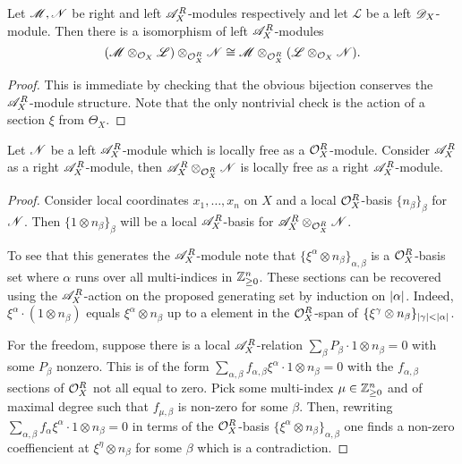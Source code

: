 \begin{lemma}\label{lem: IsomorphismTensors}
  Let $\mathscr{M}, \mathscr{N}$ be right and left $\mathscr{A}_X^R$-modules respectively and let $\mathscr{L}$ be a left $\mathscr{D}_X$-module. Then there is a isomorphism of left $\mathscr{A}_X^R$-modules
  $$(\mathscr{M} \otimes_{\mathcal{O}_X} \mathscr{L})\otimes_{\mathcal{O}_X^R} \mathscr{N} \cong \mathscr{M} \otimes_{\mathcal{O}_X^R} (\mathscr{L}\otimes_{\mathcal{O}_X} \mathscr{N}).   $$
\end{lemma}
\begin{proof}
  This is immediate by checking that the obvious bijection conserves the $\mathscr{A}_X^R$-module structure. Note that the only nontrivial check is the action of a section $\xi$ from $\Theta_X$.
\end{proof}
\begin{lemma}\label{lem: FreeLeftAModuleTensor}
  Let $\mathscr{N}$ be a left $\mathscr{A}_X^R$-module which is locally free as a $\mathcal{O}_X^R$-module. Consider $\mathscr{A}_X^R$ as a right $\mathscr{A}_X^R$-module, then $\mathscr{A}_X^R \otimes_{\mathcal{O}_X^R} \mathscr{N}$ is locally free as a right $\mathscr{A}_X^R$-module.
\end{lemma}
\begin{proof}
  Consider local coordinates $x_1,\ldots, x_n$ on $X$ and a local $\mathcal{O}_X^R$-basis $\{n_\beta\}_\beta$ for $\mathscr{N}$. Then $\{1\otimes n_\beta\}_{\beta}$ will be a local $\mathscr{A}_X^R$-basis for $\mathscr{A}_X^R \otimes_{\mathcal{O}_X^R} \mathscr{N}$.

  To see that this generates the $\mathscr{A}_X^R$-module note that $\{\xi^\alpha \otimes n_\beta\}_{\alpha,\beta}$
  is a $\mathcal{O}_X^R$-basis set where $\alpha$ runs over all multi-indices in $\mathbb{Z}_{\geq 0}^n$.
  These sections can be recovered using the $\mathscr{A}_X^R$-action on the proposed generating set by induction on $\vert \alpha \vert$.
  Indeed, $\xi^\alpha \cdot (1 \otimes n_\beta)$ equals $\xi^\alpha \otimes n_\beta$ up to a element in the $\mathcal{O}_X^R$-span of $\{\xi^\gamma \otimes n_\beta\}_{\vert \gamma \vert<\vert \alpha \vert}$.

  For the freedom, suppose there is a local $\mathscr{A}_X^R$-relation $\sum_\beta P_\beta \cdot 1\otimes n_\beta = 0$ with some $P_\beta$ nonzero. This is of the form $\sum_{\alpha, \beta} f_{\alpha,\beta} \xi^\alpha \cdot 1\otimes n_\beta = 0$ with the $f_{\alpha,\beta}$ sections of $\mathcal{O}_X^R$ not all equal to zero.
  Pick some multi-index $\mu\in \mathbb{Z}_{\geq 0}^n$ and of maximal degree such that $f_{\mu,\beta}$ is non-zero for some $\beta$.
  Then, rewriting $\sum_{\alpha, \beta} f_\alpha \xi^\alpha \cdot 1\otimes n_\beta = 0$ in terms of the $\mathcal{O}_X^R$-basis $\{\xi^\alpha \otimes n_\beta\}_{\alpha,\beta}$ one finds a non-zero coeffiencient at $\xi^\eta \otimes n_\beta$ for some $\beta$ which is a contradiction.
\end{proof}
